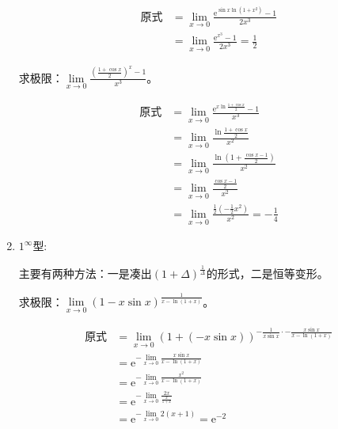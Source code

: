\begin{enumerate}
            \begin{solution}
                \begin{align*}
                \text{原式}
                &=\lim_{x \to 0}\frac{\mathrm{e}^{\sin x \ln (1+x^2)}-1}{2x^3}\\
                 &=\lim_{x \to 0}\frac{\mathrm{e}^{x^3}-1}{2x^3}=\frac{1}{2}
             \end{align*}
            \end{solution}

            \begin{example}
                求极限：$\lim\limits_{x \to 0} \displaystyle\frac{(\frac{1+\cos x}{2})^x-1}{x^3}$。
            \end{example}

            \begin{solution}
            \begin{align*}
                \text{原式}
                &=\lim_{x \to 0}\frac{\mathrm{e}^{x \ln{\frac{1+\cos x}{2}}}-1}{x^3}\\
                 &=\lim_{x \to 0}\frac{\ln{\frac{1+\cos x}{2}}}{x^2}\\
                 &=\lim_{x \to 0} \frac{\ln{(1+\frac{\cos x-1}{2})}}{x^2}\\
                 &=\lim_{x \to 0}\frac{\frac{\cos x-1}{2}}{x^2}\\
                 &=\lim_{x \to 0}\frac{\frac{1}{2} (-\frac{1}{2}x^2)}{x^2}=-\frac{1}{4}
            \end{align*}
            \end{solution}

            \item $ 1^{\infty} $型:
            

            主要有两种方法：一是凑出$(1+\Delta)^{\frac{1}{\Delta}}$的形式，二是恒等变形。

            \begin{example}
                求极限：$\lim\limits_{ x \to 0}(1-x\sin x)^{\frac{1}{x - \ln (1+x)}}$。
            \end{example}
            
            \begin{solution}
                \begin{align*}
                    \text{原式}
                    &=\lim_{ x\to 0}(1+(-x \sin x))^{-\frac{1}{x \sin x} \cdot -\frac{x \sin x}{x-\ln (1+x)}}\\
                    &= \mathrm{e}^{-\lim\limits_{x \to 0}\frac{x \sin x}{x-\ln(1+x)}}\\
                    &= \mathrm{e}^{-\lim\limits_{x \to 0}\frac{x^2}{x -\ln(1+x)}}\\
                    &= \mathrm{e}^{-\lim\limits_{x \to 0}\frac{2x}{\frac{x}{1+x}}}\\
                    &= \mathrm{e}^{-\lim\limits_{x \to 0}2(x+1)}=\mathrm{e}^{-2}
                \end{align*}
            \end{solution}


\end{enumerate}
